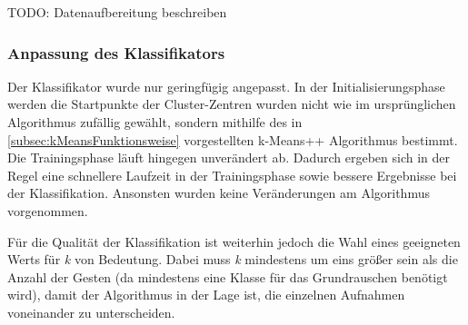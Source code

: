 TODO: Datenaufbereitung beschreiben 



\subsubsection{Anpassung des Klassifikators}
Der Klassifikator wurde nur geringfügig angepasst.
In der Initialisierungsphase werden die Startpunkte der Cluster-Zentren wurden nicht wie im ursprünglichen Algorithmus zufällig gewählt, sondern mithilfe des in \autoref{subsec:kMeansFunktionsweise} vorgestellten k-Means++ Algorithmus bestimmt. Die Trainingsphase läuft hingegen unverändert ab.
 Dadurch ergeben sich in der Regel eine schnellere Laufzeit in der Trainingsphase sowie bessere Ergebnisse bei der Klassifikation.
Ansonsten wurden keine Veränderungen am Algorithmus vorgenommen.

Für die Qualität der Klassifikation ist weiterhin jedoch die Wahl eines geeigneten Werts für \emph{k} von Bedeutung. Dabei muss \emph{k} mindestens um eins größer sein als die Anzahl der Gesten (da mindestens eine Klasse für das Grundrauschen benötigt wird),
damit der Algorithmus in der Lage ist, die einzelnen Aufnahmen voneinander zu unterscheiden.  


